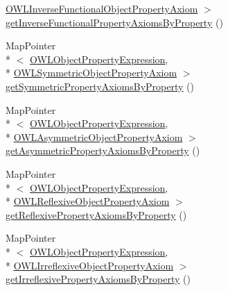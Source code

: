 \begin{DoxyCompactItemize}
\hyperlink{interfaceorg_1_1semanticweb_1_1owlapi_1_1model_1_1_o_w_l_inverse_functional_object_property_axiom}{O\-W\-L\-Inverse\-Functional\-Object\-Property\-Axiom} $>$ \hyperlink{classuk_1_1ac_1_1manchester_1_1cs_1_1owl_1_1owlapi_1_1_abstract_internals_impl_ad1b76ecda1b205d717b36221a50c5986}{get\-Inverse\-Functional\-Property\-Axioms\-By\-Property} ()
\item 
Map\-Pointer\\*
$<$ \hyperlink{interfaceorg_1_1semanticweb_1_1owlapi_1_1model_1_1_o_w_l_object_property_expression}{O\-W\-L\-Object\-Property\-Expression}, \\*
\hyperlink{interfaceorg_1_1semanticweb_1_1owlapi_1_1model_1_1_o_w_l_symmetric_object_property_axiom}{O\-W\-L\-Symmetric\-Object\-Property\-Axiom} $>$ \hyperlink{classuk_1_1ac_1_1manchester_1_1cs_1_1owl_1_1owlapi_1_1_abstract_internals_impl_af4a915b6ceea1080d7533afbb4bef264}{get\-Symmetric\-Property\-Axioms\-By\-Property} ()
\item 
Map\-Pointer\\*
$<$ \hyperlink{interfaceorg_1_1semanticweb_1_1owlapi_1_1model_1_1_o_w_l_object_property_expression}{O\-W\-L\-Object\-Property\-Expression}, \\*
\hyperlink{interfaceorg_1_1semanticweb_1_1owlapi_1_1model_1_1_o_w_l_asymmetric_object_property_axiom}{O\-W\-L\-Asymmetric\-Object\-Property\-Axiom} $>$ \hyperlink{classuk_1_1ac_1_1manchester_1_1cs_1_1owl_1_1owlapi_1_1_abstract_internals_impl_af2e243c178b8d9c494eef236692f5595}{get\-Asymmetric\-Property\-Axioms\-By\-Property} ()
\item 
Map\-Pointer\\*
$<$ \hyperlink{interfaceorg_1_1semanticweb_1_1owlapi_1_1model_1_1_o_w_l_object_property_expression}{O\-W\-L\-Object\-Property\-Expression}, \\*
\hyperlink{interfaceorg_1_1semanticweb_1_1owlapi_1_1model_1_1_o_w_l_reflexive_object_property_axiom}{O\-W\-L\-Reflexive\-Object\-Property\-Axiom} $>$ \hyperlink{classuk_1_1ac_1_1manchester_1_1cs_1_1owl_1_1owlapi_1_1_abstract_internals_impl_ae3c7a3b6ffe14ab4bfc6e7775fb79a02}{get\-Reflexive\-Property\-Axioms\-By\-Property} ()
\item 
Map\-Pointer\\*
$<$ \hyperlink{interfaceorg_1_1semanticweb_1_1owlapi_1_1model_1_1_o_w_l_object_property_expression}{O\-W\-L\-Object\-Property\-Expression}, \\*
\hyperlink{interfaceorg_1_1semanticweb_1_1owlapi_1_1model_1_1_o_w_l_irreflexive_object_property_axiom}{O\-W\-L\-Irreflexive\-Object\-Property\-Axiom} $>$ \hyperlink{classuk_1_1ac_1_1manchester_1_1cs_1_1owl_1_1owlapi_1_1_abstract_internals_impl_ad14edbef60fa6956db168372ad7bb6fe}{get\-Irreflexive\-Property\-Axioms\-By\-Property} ()

\end{DoxyCompactItemize}
